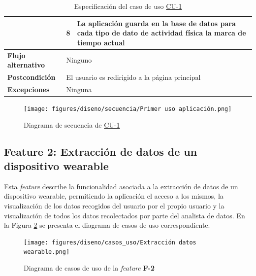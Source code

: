 \begin{table}[h]
\begin{tabularx}{\textwidth}{|l|l|X|}
                    \cline{2-3} & 8 & La aplicación guarda en la base de datos para cada tipo de dato de actividad física la marca de tiempo actual \\
                    \hline
                    \textbf{Flujo alternativo} & \multicolumn{2}{|X|}{Ninguno} \\
                    \hline
                    \textbf{Postcondición} & \multicolumn{2}{|X|}{El usuario es redirigido a la página principal} \\
                    \hline
                    \textbf{Excepciones} & \multicolumn{2}{|X|}{Ninguna} \\
                    \hline
                \end{tabularx}
                \caption{Especificación del caso de uso \hyperref[disenio:casos_uso:primer_uso]{CU-1}}
                \label{tabla:casos_uso:primer_uso}
            \end{table}  

            \begin{figure}[h]
                \centering
                \texttt{[image: figures/diseno/secuencia/Primer uso aplicación.png]}
                \caption{Diagrama de secuencia de \hyperref[disenio:casos_uso:primer_uso]{CU-1}}
                \label{figure:diagrama_secuencia:primer_uso}
            \end{figure}

            \clearpage  %

        \subsection*{Feature 2: Extracción de datos de un dispositivo wearable}

            Esta \textit{feature} describe la funcionalidad asociada a la extracción de datos de un dispositivo \gls{wearable}, permitiendo la aplicación el acceso a los mismos, la visualización de los datos recogidos del usuario por el propio usuario y la visualización de todos los datos recolectados por parte del analista de datos. En la Figura \ref{figure:diagrama_casos_uso:f2} se presenta el diagrama de casos de uso correspondiente.

            \begin{figure}[h]
                \centering
                \texttt{[image: figures/diseno/casos\_uso/Extracción datos wearable.png]}
                \caption{Diagrama de casos de uso de la \textit{feature} \textbf{F-2}}
                \label{figure:diagrama_casos_uso:f2}
            \end{figure}

